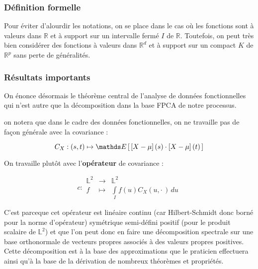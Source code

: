 \subsubsection{Définition formelle}

Pour éviter d'alourdir les notations, on se place dans le cas où les fonctions sont à valeurs dans $\mathds R$ et à support sur un intervalle fermé $I$ de $\mathds R$. Toutefois, on peut très bien considérer des fonctions à valeurs dans $\mathds R^d$ et à support sur un compact $K$ de $\mathds R^p$ sans perte de généralités.



\subsubsection{Résultats importants}

On énonce désormais le théorème central de l'analyse de données fonctionnelles qui n'est autre que la décomposition dans la base FPCA de notre processus.

\begin{rem}
	on notera que dans le cadre des données fonctionnelles, on ne travaille pas de façon générale avec la covariance :

	$$C_X : (s,t) \mapsto \esperance{ \left[X - \mu\right](s) \cdot \left[X - \mu\right](t) }$$

	On travaille plutôt avec l'\textbf{opérateur} de covariance :

	\begin{equation*}
		c : \begin{array}{ccc}
			\mathds L^2 & \longrightarrow & \mathds L^2                             \\
			f           & \longmapsto     & \int\limits_I f(u)C_X(u, \cdot \,) \,du
		\end{array}
	\end{equation*}

	C'est parceque cet opérateur est linéaire continu (car Hilbert-Schmidt donc borné pour la norme d'opérateur) symétrique semi-défini positif (pour le produit scalaire de $\mathds L^2$) et que l'on peut donc en faire une décomposition spectrale sur une base orthonormale de vecteurs propres associés à des valeurs propres positives. Cette décomposition est à la base des approximations que le praticien effectuera ainsi qu'à la base de la dérivation de nombreux théorèmes et propriétés.
\end{rem}

